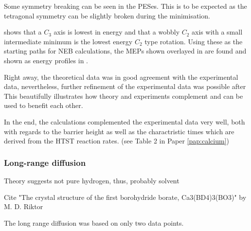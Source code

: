 Some symmetry breaking can be seen in the PESes.
This is to be expected as the tetragonal symmetry can be slightly broken during the minimisation.

 shows that a $C_3$ axis is lowest in energy and that a wobbly $C_2$ axis with a small intermediate minimum is the lowest energy $C_2$ type rotation.
Using these as the starting paths for NEB calculations, the MEPs shown overlayed in  are found and shown as energy profiles in .

Right away, the theoretical data was in good agreement with the experimental data, nevertheless, further refinement of the experimental data was possible after \expand
This beautifully illustrates how theory and experiments complement and can be used to benefit each other.

In the end, the calculations complemented the experimental data very well, both with regards to the barrier height as well as the charactristic times which are derived from the HTST reaction rates. (see Table 2 in Paper \ref{pap:calcium})

\subsubsection{Long-range diffusion \pending}

\bit
\item Theory suggests not pure hydrogen, thus, probably solvent
\item Cite "The crystal structure of the first borohydride borate, Ca3(BD4)3(BO3)" by M. D. Riktor
\eit

The long range diffusion was based on only two data points.

\incomplete

